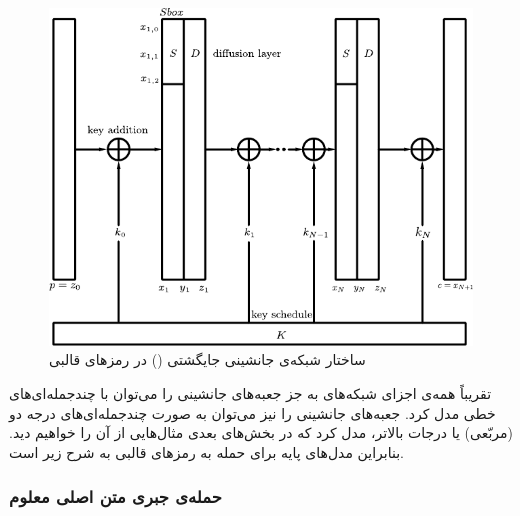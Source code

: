 \begin{figure}[t]
\centering
\includegraphics[width=0.7\linewidth]{Images/BlockCipher1}
\caption{ساختار شبکه‌ی جانشینی جایگشتی
	()
	در رمزهای قالبی}
\label{fig:blockcipher1}
\end{figure}


تقریباً همه‌ی اجزای شبکه‌های 
به جز جعبه‌های جانشینی را می‌توان با چندجمله‌ای‌های خطی مدل کرد.  جعبه‌های جانشینی را نیز می‌توان به صورت چند‌جمله‌ای‌های درجه دو (مربّعی)
یا درجات بالاتر، مدل کرد که در بخش‌های بعدی مثال‌هایی از آن را خواهیم دید. بنابراین مدل‌های پایه‌ برای حمله به رمزهای قالبی به شرح زیر است.
\subsubsection*{حمله‌ی جبری متن اصلی معلوم}


